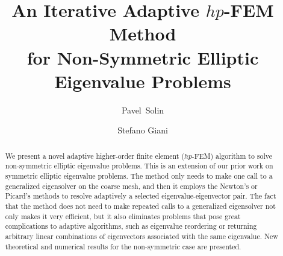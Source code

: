 \documentclass[smallextended]{svjour3}
\begin{document}
\title{An Iterative Adaptive $hp$-FEM Method\\ for Non-Symmetric Elliptic Eigenvalue Problems}

\subtitle{}

%

\author{Pavel~Solin \and Stefano Giani}





\date{}

\maketitle





\begin{abstract}
We present a novel adaptive higher-order finite element ($hp$-FEM) algorithm 
to solve non-symmetric elliptic eigenvalue problems. This is an extension of 
our prior work on symmetric elliptic eigenvalue problems. The method 
only needs to make one call to a generalized eigensolver on the coarse mesh, and 
then it employs the Newton's or Picard's methods to resolve adaptively 
a selected eigenvalue-eigenvector pair. The fact that the method does not need to make 
repeated calls to a generalized eigensolver not only makes it very 
efficient, but it also eliminates problems that 
pose great complications to adaptive algorithms, such as eigenvalue reordering 
or returning arbitrary linear combinations of eigenvectors associated with the same 
eigenvalue. New theoretical and numerical results for the non-symmetric case 
are presented.


\end{abstract}
\end{document}
